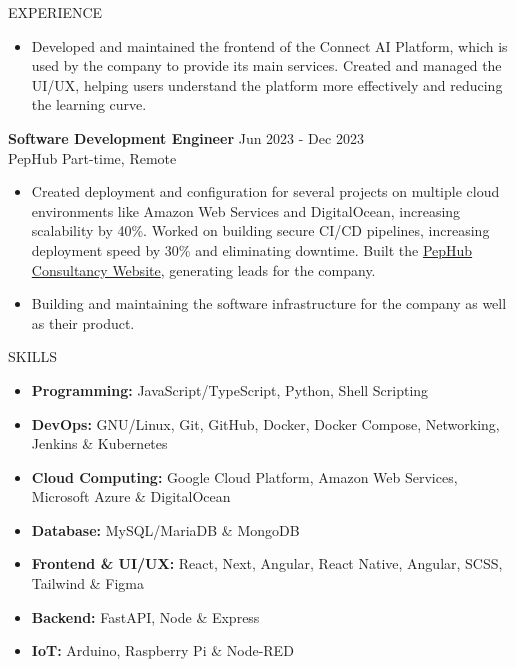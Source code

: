\documentclass{resume}
\begin{document}
\begin{rSection}{EXPERIENCE}
  \begin{itemize}
    \item{Developed and maintained the frontend of the Connect AI Platform, which is used by the company to provide its main services. Created and managed the UI/UX, helping users understand the platform more effectively and reducing the learning curve.}
  \end{itemize}
  \vspace{-0.4em}
  {\bf Software Development Engineer} \hfill {Jun 2023 - Dec 2023}\\
  PepHub \hfill {Part-time, Remote}
  \vspace{-0.4em}
  \begin{itemize}
    \item{Created deployment and configuration for several projects on multiple cloud environments like Amazon Web Services and DigitalOcean, increasing scalability by 40\%. Worked on building secure CI/CD pipelines, increasing deployment speed by 30\% and eliminating downtime. Built the {\href{https://consultancy.pephub.tech}{PepHub Consultancy Website}}, generating leads for the company.}
  \end{itemize}
  \vspace{-0.4em}
  \begin{itemize}
    \item{Building and maintaining the software infrastructure for the company as well as their product.}
  \end{itemize}
\end{rSection}
\vspace{-0.4em}
\begin{rSection}{SKILLS}
  \begin{itemize}
    \item \textbf{Programming:} JavaScript/TypeScript, Python, Shell Scripting
    \item \textbf{DevOps:} GNU/Linux, Git, GitHub, Docker, Docker Compose, Networking, Jenkins \& Kubernetes
    \item \textbf{Cloud Computing:} Google Cloud Platform, Amazon Web Services, Microsoft Azure \& DigitalOcean
    \item \textbf{Database:} MySQL/MariaDB \& MongoDB
    \item \textbf{Frontend \& UI/UX:} React, Next, Angular, React Native, Angular, SCSS, Tailwind \& Figma
    \item \textbf{Backend:} FastAPI, Node \& Express
    \item \textbf{IoT:} Arduino, Raspberry Pi \& Node-RED
  \end{itemize}
\end{rSection}
\end{document}
